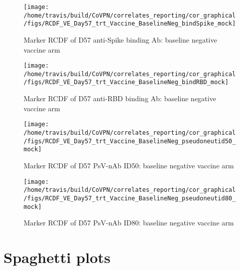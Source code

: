\documentclass[]{book}
\theoremstyle{definition}
\theoremstyle{definition}
\theoremstyle{definition}
\newcommand{\1}{\mathbbm{1}}
\begin{document}
\begin{figure}[H]

{\centering \texttt{[image: /home/travis/build/CoVPN/correlates\_reporting/cor\_graphical/figs/RCDF\_VE\_Day57\_trt\_Vaccine\_BaselineNeg\_bindSpike\_mock]} 

}

\caption{Marker RCDF of D57 anti-Spike binding Ab: baseline negative vaccine arm}\label{fig:unnamed-chunk-21}
\end{figure}

\clearpage
\begin{figure}[H]

{\centering \texttt{[image: /home/travis/build/CoVPN/correlates\_reporting/cor\_graphical/figs/RCDF\_VE\_Day57\_trt\_Vaccine\_BaselineNeg\_bindRBD\_mock]} 

}

\caption{Marker RCDF of D57 anti-RBD binding Ab: baseline negative vaccine arm}\label{fig:unnamed-chunk-22}
\end{figure}

\clearpage
\begin{figure}[H]

{\centering \texttt{[image: /home/travis/build/CoVPN/correlates\_reporting/cor\_graphical/figs/RCDF\_VE\_Day57\_trt\_Vaccine\_BaselineNeg\_pseudoneutid50\_mock]} 

}

\caption{Marker RCDF of D57 PsV-nAb ID50: baseline negative vaccine arm}\label{fig:unnamed-chunk-23}
\end{figure}

\clearpage
\begin{figure}[H]

{\centering \texttt{[image: /home/travis/build/CoVPN/correlates\_reporting/cor\_graphical/figs/RCDF\_VE\_Day57\_trt\_Vaccine\_BaselineNeg\_pseudoneutid80\_mock]} 

}

\caption{Marker RCDF of D57 PsV-nAb ID80: baseline negative vaccine arm}\label{fig:unnamed-chunk-24}
\end{figure}

\clearpage

\hypertarget{spaghetti-plots}{%
\section{Spaghetti plots}\label{spaghetti-plots}}
\end{document}
